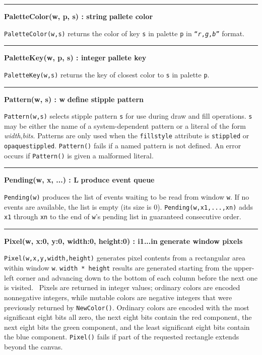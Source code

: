 \bigskip\hrule\vspace{0.1cm}
\noindent
{\bf PaletteColor(w, p, s) : string } \hfill {\bf pallete color}

\noindent
\texttt{PaletteColor(w,s)} returns the color of key \texttt{s} in
palette \texttt{p} in
\texttt{{\textquotedblleft}}\texttt{\textit{r}}\texttt{,}\texttt{\textit{g}}\texttt{,}\texttt{\textit{b}}\texttt{{\textquotedblright}}
format.

\bigskip\hrule\vspace{0.1cm}
\noindent
{\bf PaletteKey(w, p, s) : integer } \hfill {\bf pallete key}

\noindent
\texttt{PaletteKey(w,s)} returns the key of closest color to \texttt{s}
in palette \texttt{p}.

\bigskip\hrule\vspace{0.1cm}
\noindent
{\bf Pattern(w, s) : w } \hfill {\bf define stipple pattern}

\noindent
\texttt{Pattern(w,s)} selects stipple pattern \texttt{s} for use during
draw and fill operations. \texttt{s} may be either the name of a
system-dependent pattern or a literal of the form
\textit{width},\textit{bits}. Patterns are only used when the
\texttt{fillstyle} attribute is \texttt{stippled} or
\texttt{opaquestippled}. \texttt{Pattern()} fails if a named pattern
is not defined. An error occurs if \texttt{Pattern()} is given a
malformed literal.

\bigskip\hrule\vspace{0.1cm}
\noindent
{\bf Pending(w, x, ...) : L } \hfill {\bf produce event queue}

\noindent
\texttt{Pending(w)} produces the list of events waiting to be read from
window \texttt{w}. If no events are available, the list is empty (its
size is 0). \texttt{Pending(w,x1,...,xn)} adds \texttt{x1} through
\texttt{xn} to the end of \texttt{w}'s pending list in
guaranteed consecutive order.

\bigskip\hrule\vspace{0.1cm}
\noindent
{\bf Pixel(w, x:0, y:0, width:0, height:0) : i1...in } \hfill {\bf generate window pixels}

\noindent
\texttt{Pixel(w,x,y,width,height)} generates pixel contents from a
rectangular area within window \texttt{w}. \texttt{width * height}
results are generated starting from the upper-left corner and advancing
down to the bottom of each column before the next one is visited.
\ Pixels are returned in integer values; ordinary colors are encoded
nonnegative integers, while mutable colors are negative integers that
were previously returned by \texttt{NewColor()}. Ordinary colors are
encoded with the most significant eight bits all zero, the next eight
bits contain the red component, the next eight bits the green
component, and the least significant eight bits contain the blue
component. \texttt{Pixel()} fails if part of the requested rectangle
extends beyond the canvas.

